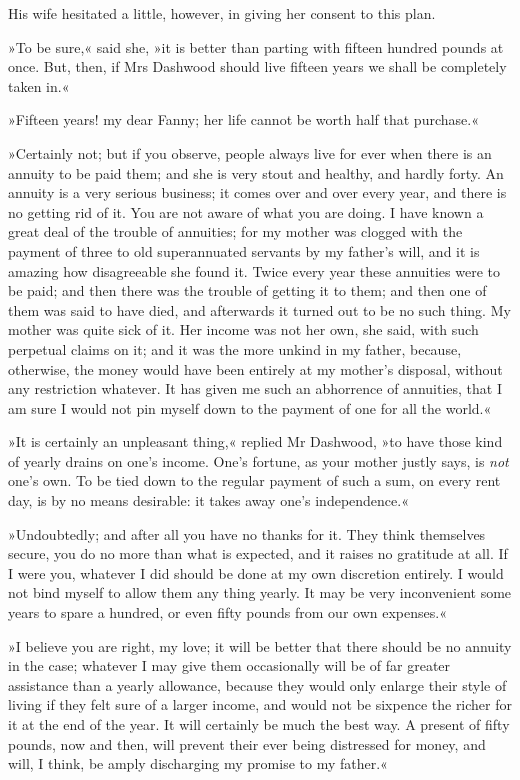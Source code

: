 His wife hesitated a little, however, in giving her consent to this plan.

»To be sure,« said she, »it is better than parting with fifteen hundred pounds at once. But, then, if Mrs Dashwood should live fifteen years we shall be completely taken in.«

»Fifteen years! my dear Fanny; her life cannot be worth half that purchase.«

»Certainly not; but if you observe, people always live for ever when there is an annuity to be paid them; and she is very stout and healthy, and hardly forty. An annuity is a very serious business; it comes over and over every year, and there is no getting rid of it. You are not aware of what you are doing. I have known a great deal of the trouble of annuities; for my mother was clogged with the payment of three to old superannuated servants by my father’s will, and it is amazing how disagreeable she found it. Twice every year these annuities were to be paid; and then there was the trouble of getting it to them; and then one of them was said to have died, and afterwards it turned out to be no such thing. My mother was quite sick of it. Her income was not her own, she said, with such perpetual claims on it; and it was the more unkind in my father, because, otherwise, the money would have been entirely at my mother’s disposal, without any restriction whatever. It has given me such an abhorrence of annuities, that I am sure I would not pin myself down to the payment of one for all the world.«

»It is certainly an unpleasant thing,« replied Mr Dashwood, »to have those kind of yearly drains on one’s income. One’s fortune, as your mother justly says, is \textit{not} one’s own. To be tied down to the regular payment of such a sum, on every rent day, is by no means desirable: it takes away one’s independence.«

»Undoubtedly; and after all you have no thanks for it. They think themselves secure, you do no more than what is expected, and it raises no gratitude at all. If I were you, whatever I did should be done at my own discretion entirely. I would not bind myself to allow them any thing yearly. It may be very inconvenient some years to spare a hundred, or even fifty pounds from our own expenses.«

»I believe you are right, my love; it will be better that there should be no annuity in the case; whatever I may give them occasionally will be of far greater assistance than a yearly allowance, because they would only enlarge their style of living if they felt sure of a larger income, and would not be sixpence the richer for it at the end of the year. It will certainly be much the best way. A present of fifty pounds, now and then, will prevent their ever being distressed for money, and will, I think, be amply discharging my promise to my father.«

